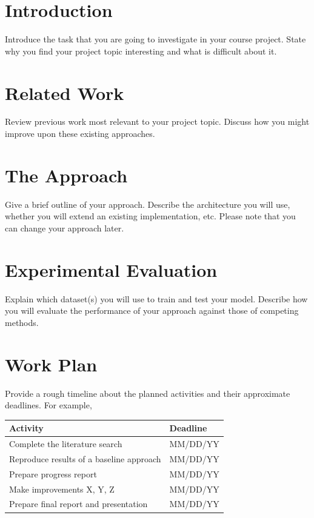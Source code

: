 \documentclass{article}
\begin{document}
\section{Introduction}
Introduce the task that you are going to investigate in your course project. State why you find your project topic interesting and what is difficult about it.

\section{Related Work}
Review previous work most relevant to your project topic. Discuss how you might improve upon these existing approaches.

\section{The Approach}
Give a brief outline of your approach. Describe the architecture you will use, whether you will extend an existing implementation, etc. Please note that you can change your approach later. 

\section{Experimental Evaluation}
Explain which dataset(s) you will use to train and test your model. Describe how you will evaluate the performance of your approach against those of competing methods.

\section{Work Plan}
Provide a rough timeline about the planned activities and their approximate deadlines. For example,

\begin{tabular}{|l|l|}
\hline
\textbf{Activity} & \textbf{Deadline} \\ 
\hline
Complete the literature search &	 MM/DD/YY \\
\hline
Reproduce results of a baseline approach &	MM/DD/YY \\ 
\hline
Prepare progress report &	MM/DD/YY \\
\hline
Make improvements X, Y, Z	& MM/DD/YY \\
\hline
Prepare final report and presentation & MM/DD/YY \\
\hline
\end{tabular}

\cite{Hinton:2006,Goodfellow:2014}



\end{document}
